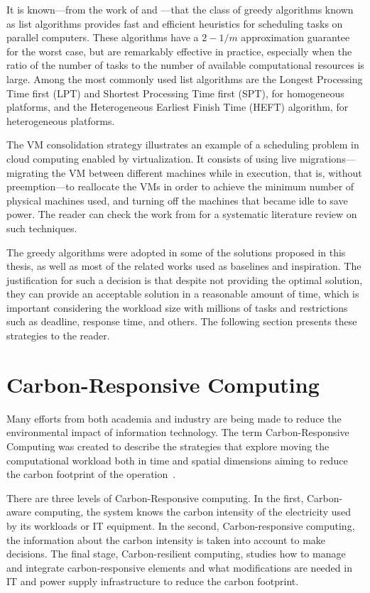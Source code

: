 It is known---from the work of \citet {graham} and \citet {Garey}---that the class of greedy algorithms known as list algorithms provides fast and efficient heuristics for scheduling tasks on parallel computers. These algorithms have a $2 -1 /m$ approximation guarantee for the worst case, but are remarkably effective in practice, especially when the ratio of the number of tasks to the number of available computational resources is large. Among the most commonly used list algorithms are the Longest Processing Time first (LPT) and Shortest Processing Time first (SPT),  for homogeneous platforms, and the Heterogeneous Earliest Finish Time (HEFT) algorithm, for heterogeneous platforms.

The VM consolidation strategy illustrates an example of a scheduling problem in cloud computing enabled by virtualization. It consists of using live migrations---migrating the VM between different machines while in execution, that is, without preemption---to reallocate the VMs in order to achieve the minimum number of physical machines used, and turning off the machines that became idle to save power. The reader can check the work from \citet{10.1145/3470972} for a systematic literature review on such techniques.


The greedy algorithms were adopted in some of the solutions proposed in this thesis, as well as most of the related works used as baselines and inspiration. The justification for such a decision is that despite not providing the optimal solution, they can provide an acceptable solution in a reasonable amount of time, which is important considering the workload size with millions of tasks and restrictions such as deadline, response time, and others. The following section presents these strategies to the reader.
\section{Carbon-Responsive Computing}

\label{sec:carbon_responsive}

Many efforts from both academia and industry are being made to reduce the environmental impact of information technology. The term Carbon-Responsive Computing was created to describe the strategies that explore moving the computational workload both in time and spatial dimensions aiming to reduce the carbon footprint of the operation~\cite{schooler2021carbonaware}.


There are three levels of Carbon-Responsive computing. In the first, Carbon-aware computing, the system knows the carbon intensity of the electricity used by its workloads or IT equipment. In the second, Carbon-responsive computing, the information about the carbon intensity is taken into account to make decisions. The final stage, Carbon-resilient computing, studies how to manage and integrate carbon-responsive elements and what modifications are needed in IT and power supply infrastructure to reduce the carbon footprint.

